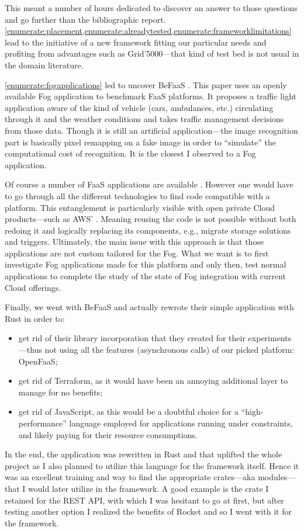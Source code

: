 This meant a number of hours dedicated to discover an answer to those questions and go further than the bibliographic report. \cref{enumerate:placement,enumerate:alreadytested,enumerate:frameworklimitations} lead to the initiative of a new framework fitting our particular needs and profiting from advantages such as Grid'5000—that kind of test bed is not usual in the domain literature.

\cref{enumerate:fogapplications} led to uncover BeFaaS \cite{grambow_befaas_2021}. This paper uses an openly available Fog application to benchmark \gls{FaaS} platforms. It proposes a traffic light application aware of the kind of vehicle (cars, ambulances, etc.) circulating through it and the weather conditions and takes traffic management decisions from those data. Though it is still an artificial application—the image recognition part is basically pixel remapping on a fake image in order to “simulate” the computational cost of recognition. It is the closest I observed to a Fog application.

Of course a number of \gls{FaaS} applications are available \cite{eskandani_wonderless_2021}. However one would have to go through all the different technologies to find code compatible with a platform. This entanglement is particularly visible with open private Cloud products—such as AWS' \cite{tarneberg_experiences_2016,eismann_state_2021}. Meaning reusing the code is not possible without both redoing it and logically replacing its components, e.g., migrate storage solutions and triggers. Ultimately, the main issue with this approach is that those applications are not custom tailored for the Fog. What we want is to first investigate Fog applications made for this platform and only then, test normal applications to complete the study of the state of Fog integration with current Cloud offerings.

Finally, we went with BeFaaS \cite{grambow_befaas_2021} and actually rewrote their simple application with Rust in order to:
\begin{itemize}
	\item get rid of their library incorporation that they created for their experiments—thus not using all the features (asynchronous calls) of our picked platform: OpenFaaS;
	\item get rid of Terraform, as it would have been an annoying additional layer to manage for no benefits;
	\item get rid of JavaScript, as this would be a doubtful choice for a “high-performance” language employed for applications running under constraints, and likely paying for their resource consumptions.
\end{itemize}
In the end, the application was rewritten in Rust and that uplifted the whole project as I also planned to utilize this language for the framework itself. Hence it was an excellent training and way to find the appropriate crates—aka modules—that I would later utilize in the framework. A good example is the crate I retained for the \gls{REST} \gls{API}, with which I was hesitant to go at first, but after testing another option I realized the benefits of Rocket \cite{benitez_rocket_2022} and so I went with it for the framework.

